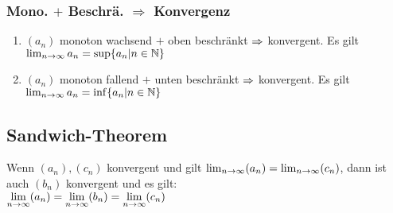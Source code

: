 \subsubsection*{\small{Mono. \texorpdfstring{$+$}{plus} Beschrä. \texorpdfstring{$\Rightarrow$}{folglich} Konvergenz}}
\begin{enumerate}[label=\alph*., noitemsep]
    \item $(a_n)$ monoton wachsend $+$ oben beschränkt $\Rightarrow$ konvergent. Es gilt $\lim_{n\rightarrow \infty} a_n= \sup \{a_n|n \in \mathbb N\}$
    \item $(a_n)$ monoton fallend $+$ unten beschränkt $\Rightarrow$ konvergent. Es gilt $\lim_{n\rightarrow \infty} a_n= \inf \{a_n|n \in \mathbb N\}$
\end{enumerate}
\subsection*{Sandwich-Theorem}
Wenn $(a_n), (c_n)$ konvergent und gilt $\lim_{n \rightarrow \infty} (a_n) = \lim_{n \rightarrow \infty} (c_n)$, dann ist auch $(b_n)$ konvergent und es gilt:\\
$\lim\limits_{n \rightarrow \infty} (a_n) = \lim\limits_{n \rightarrow \infty} (b_n) = \lim\limits_{n \rightarrow \infty} (c_n)$
